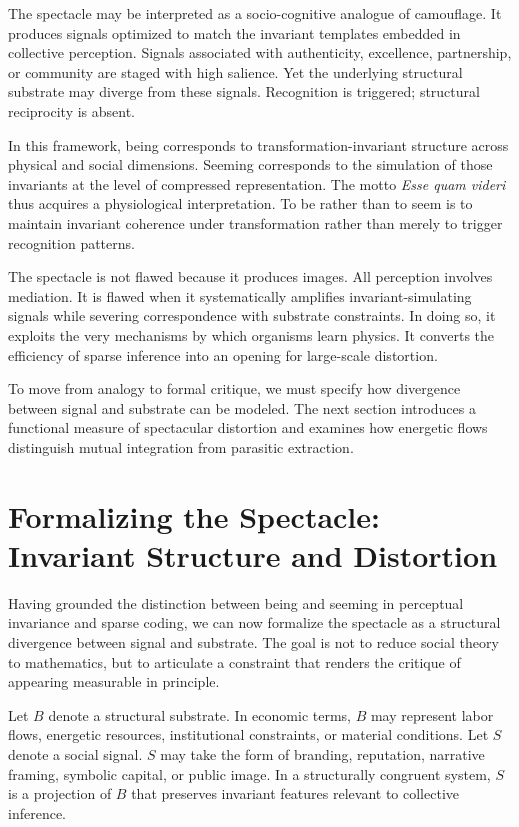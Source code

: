 \documentclass[11pt]{article}
\begin{document}
The spectacle may be interpreted as a socio-cognitive analogue of camouflage. It produces signals optimized to match the invariant templates embedded in collective perception. Signals associated with authenticity, excellence, partnership, or community are staged with high salience. Yet the underlying structural substrate may diverge from these signals. Recognition is triggered; structural reciprocity is absent.

In this framework, being corresponds to transformation-invariant structure across physical and social dimensions. Seeming corresponds to the simulation of those invariants at the level of compressed representation. The motto \textit{Esse quam videri} thus acquires a physiological interpretation. To be rather than to seem is to maintain invariant coherence under transformation rather than merely to trigger recognition patterns.

The spectacle is not flawed because it produces images. All perception involves mediation. It is flawed when it systematically amplifies invariant-simulating signals while severing correspondence with substrate constraints. In doing so, it exploits the very mechanisms by which organisms learn physics. It converts the efficiency of sparse inference into an opening for large-scale distortion.

To move from analogy to formal critique, we must specify how divergence between signal and substrate can be modeled. The next section introduces a functional measure of spectacular distortion and examines how energetic flows distinguish mutual integration from parasitic extraction.

\section{Formalizing the Spectacle: Invariant Structure and Distortion}

Having grounded the distinction between being and seeming in perceptual invariance and sparse coding, we can now formalize the spectacle as a structural divergence between signal and substrate. The goal is not to reduce social theory to mathematics, but to articulate a constraint that renders the critique of appearing measurable in principle.

Let $B$ denote a structural substrate. In economic terms, $B$ may represent labor flows, energetic resources, institutional constraints, or material conditions. Let $S$ denote a social signal. $S$ may take the form of branding, reputation, narrative framing, symbolic capital, or public image. In a structurally congruent system, $S$ is a projection of $B$ that preserves invariant features relevant to collective inference.
\end{document}
